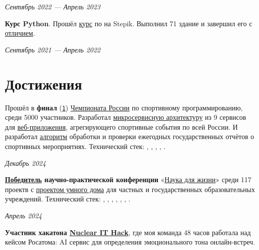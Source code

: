 \documentclass[margin,line]{resume}
\begin{document}
\begin{resume}
  \hfill \textsl{Сентябрь 2022 — Апрель 2023}

  \textbf{Курс Python}. Прошёл
  \href{https://stepik.org/course/67}{курс} по  на
  Stepik. Выполнил 71
  здание и завершил его с
  \href{https://github.com/alchemmist/CV/blob/main/attachments/stepik-python-course.pdf}{отличием}.

  \vspace{-7mm}

  \hfill \textsl{Сентябрь 2021 — Апрель 2022}

  \section{\mysidestyle Достижения}
  Прошёл в
  \textbf{финал}
  (\href{https://github.com/alchemmist/CV/blob/main/attachments/russian-chemp-final.pdf}{\texttt{1}})
  \href{https://events.fsp-russia.com/championship}{Чемпионата
  России} по спортивному
  программированию, среди 5000 участников. Разработал
  \href{https://github.com/alchemmist/CV/blob/main/attachments/architect.pdf}{микросервисную
  архитектуру} из 9 сервисов для
  \href{https://github.com/alchemmist/sportprog}{веб-приложения},
  агрегирующего спортивные события по
  всей России. И разработал
  \href{https://github.com/alchemmist/sport-afisha/blob/main/event_parsing_service/parse_pdf.py}{алгоритм}
  обработки и проверки ежегодных
  государственных
  отчётов о спортивных мероприятиях. Технический стек:
  , ,
  ,
  ,
  .

  \vspace{-6mm}

  \hfill \textsl{Декабрь 2024}

  \textbf{\href{https://github.com/alchemmist/CV/blob/main/attachments/scince-for-life-win.pdf}{Победитель}
  научно-практической конференции}
  «\href{https://conf.profil.mos.ru/academ}{Наука для
  жизни}» среди 117 проектв с
  \href{https://github.com/smart-cab/}{проектом умного
  дома} для частных и государственных
  образовательных учреждений. Технический стек: ,
  , , ,
  , , .
  \vspace{-6mm}

  \hfill \textsl{Апрель 2024}

  \textbf{Участник хакатона \href{https://nuclearhack.mephi.ru/}{Nuclear
  IT Hack}}, где моя команда 48 часов работала
  над кейсом Росатома: AI сервис для определения эмоционального тона
  онлайн-встреч.


\end{resume}
\end{document}

